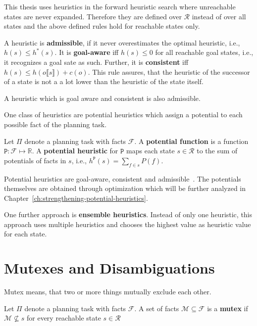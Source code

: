 This thesis uses heuristics in the forward heuristic search where unreachable states are never expanded.
Therefore they are defined over $\mathcal{R}$ instead of over all states and the above defined rules hold for reachable states only.

A heuristic is \textbf{admissible}, if it never overestimates the optimal heuristic, i.e., $h(s)\leq h^*(s)$.
It is \textbf{goal-aware} iff $h(s)\leq 0$ for all reachable goal states, i.e., it recognizes a goal sate as such.
Further, it is \textbf{consistent} iff $h(s)\leq h(o\llbracket s\rrbracket)+c(o)$.
This rule assures, that the heuristic of the successor of a state is not a a lot lower than the heuristic of the state itself.

A heuristic which is goal aware and consistent is also admissible.

One class of heuristics are potential heuristics which assign a potential to each possible fact of the planning task.
\begin{definition}
    Let $\Pi$ denote a planning task with facts $\mathcal{F}$.
    A \textbf{potential function} is a function $\mathtt{P}:\mathcal{F}\mapsto\mathbb{R}$.
    A \textbf{potential heuristic} for $\mathtt{P}$ maps each state $s\in\mathcal{R}$ to the sum of potentials of facts in $s$, i.e., $h^\mathtt{P}(s)=\sum_{f\in s}P(f)$.
\end{definition}

Potential heuristics are goal-aware, consistent and admissible~\cite{fivser2020strengthening}.
The potentials themselves are obtained through optimization which will be further analyzed in Chapter~\ref{ch:strengthening-potential-heuristics}.

One further approach is \textbf{ensemble heuristics}.
Instead of only one heuristic, this approach uses multiple heuristics and chooses the highest value as heuristic value for each state.

\section{Mutexes and Disambiguations}\label{sec:mutexes-and-disambiguations}
Mutex means, that two or more things mutually exclude each other.

\begin{definition}
    Let $\Pi$ denote a planning task with facts $\mathcal{F}$.
    A set of facts $\mathcal{M}\subseteq \mathcal{F}$ is a \textbf{mutex} if $\mathcal{M}\nsubseteq s$ for every reachable state $s\in\mathcal{R}$
\end{definition}

